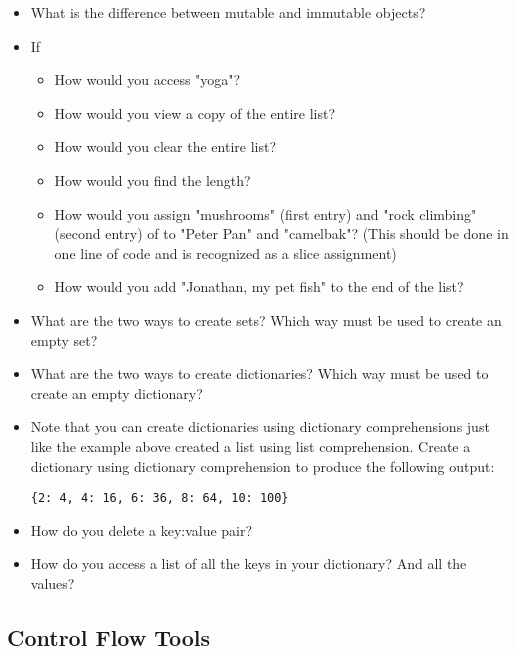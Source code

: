 \begin{problem}
\begin{itemize}
\item What is the difference between mutable and immutable objects?
\item If 
\begin{itemize}
	\item How would you access "yoga"? 
	\item How would you view a copy of the entire list?
	\item How would you clear the entire list? 
	\item How would you find the length? 
	\item How would you assign "mushrooms" (first entry) and "rock climbing" (second entry) 
	of  to "Peter Pan" and "camelbak"? 
	(This should be done in one line of code and is recognized as a slice assignment)
	\item How would you add "Jonathan, my pet fish" to the end of the list?
\end{itemize}

\item What are the two ways to create sets? Which way must be used to 
create an empty set?
\item What are the two ways to create dictionaries? Which way must be used to
create an empty dictionary?
\item Note that you can create dictionaries using dictionary comprehensions
just like the example above created a list using list comprehension.
Create a dictionary using dictionary comprehension to produce the following output:

\begin{lstlisting}
{2: 4, 4: 16, 6: 36, 8: 64, 10: 100}
\end{lstlisting}
\item How do you delete a key:value pair?
\item How do you access a list of all the keys in your dictionary? And all the values?
\end{itemize}
\end{problem}


\subsection*{Control Flow Tools}

